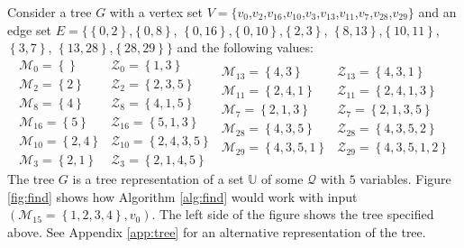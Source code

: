 Consider a tree $G$ with a vertex set
$
V =
\{
v_0$,$v_2$,$v_{16}$,$v_{10}$,$v_3$,$v_{13}$,$v_{11}$,$v_7$,$v_{28}$,$v_{29}
\}
$
and an edge set
$
E = \{
\left\{{0,2}\right\}$,$\left\{{0,8}\right\}$,
$\left\{{0,16}\right\}$,$\left\{{0,10}\right\}$,$\left\{{2,3}\right\}$,
$\left\{{8,13}\right\}$,$\left\{{10,11}\right\}$,
$\left\{{3,7}\right\}$,
$\left\{{13,28}\right\}$,$\left\{{28,29}\right\} \}
$
and the following values:
\[
    \begin{array}{ll}
        \mathcal{M}_0    = \left\{{}\right\}           & \mathcal{Z}_0    = \left\{{1,3}\right\} \\
        \mathcal{M}_2    = \left\{{2}\right\}          & \mathcal{Z}_2    = \left\{{2,3,5}\right\} \\
        \mathcal{M}_8    = \left\{{4}\right\}          & \mathcal{Z}_8    = \left\{{4,1,5}\right\} \\
        \mathcal{M}_{16} = \left\{{5}\right\}          & \mathcal{Z}_{16} = \left\{{5,1,3}\right\} \\
        \mathcal{M}_{10} = \left\{{2,4}\right\}        & \mathcal{Z}_{10} = \left\{{2,4,3,5}\right\} \\
        \mathcal{M}_3    = \left\{{2,1}\right\}        & \mathcal{Z}_3    = \left\{{2,1,4,5}\right\}
    \end{array}
    \begin{array}{ll}
        \mathcal{M}_{13} = \left\{{4,3}\right\}        & \mathcal{Z}_{13} = \left\{{4,3,1}\right\} \\
        \mathcal{M}_{11} = \left\{{2,4,1}\right\}      & \mathcal{Z}_{11} = \left\{{2,4,1,3}\right\} \\
        \mathcal{M}_7    = \left\{{2,1,3}\right\}      & \mathcal{Z}_7    = \left\{{2,1,3,5}\right\} \\
        \mathcal{M}_{28} = \left\{{4,3,5}\right\}      & \mathcal{Z}_{28} = \left\{{4,3,5,2}\right\} \\
        \mathcal{M}_{29} = \left\{{4,3,5,1}\right\}    & \mathcal{Z}_{29} = \left\{{4,3,5,1,2}\right\} \\
    \end{array}
\]
The tree $G$ is a tree representation of a set $\mathbb{U}$ of some
$\mathcal{Q}$ with $5$ variables.
Figure \ref{fig:find} shows how Algorithm \ref{alg:find} would work with input
$(\mathcal{M}_{15} = \left\{{1,2,3,4}\right\}, v_0)$.
The left side of the figure shows the tree specified above.
See Appendix \ref{app:tree} for an alternative representation of the tree.

